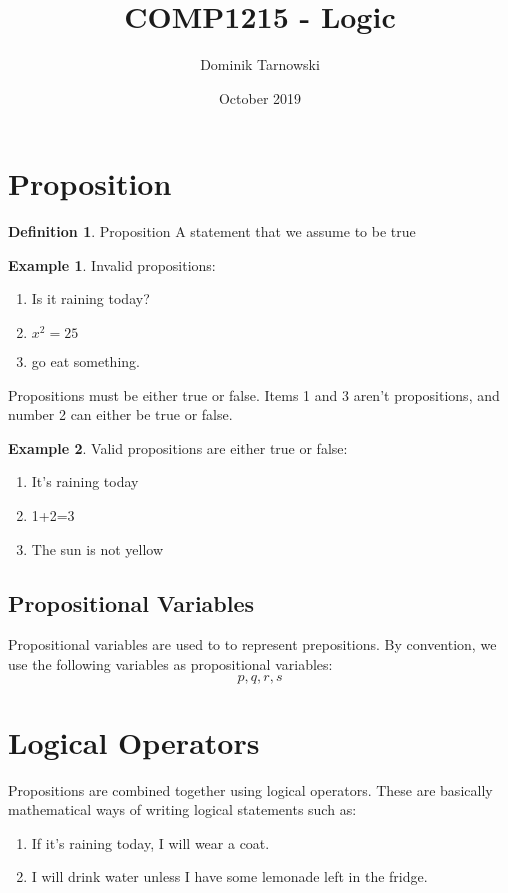 \documentclass{article}
\theoremstyle{definition}
\newtheorem{df}{Definition}[section]
\newtheorem{ex}{Example}[section]
\begin{document}
  \title{COMP1215 - Logic}
  \author{Dominik Tarnowski}
  \date{October 2019}
  \maketitle

  \tableofcontents

  \section{Proposition}
  \begin{df}{Proposition}
     A statement that we assume to be true
  \end{df}

  \begin{ex}
    Invalid propositions:
    \begin{enumerate}
      \item Is it raining today?
      \item $x^2=25$
      \item go eat something.
    \end{enumerate}
    Propositions must be either true or false. Items 1 and 3 aren't propositions, and number 2 can either be true or false.
  \end{ex}
  
  \begin{ex}
  Valid propositions are either true or false:
  \begin{enumerate}
    \item It's raining today
    \item 1+2=3
    \item The sun is not yellow
  \end{enumerate}
  \end{ex}

  \subsection{Propositional Variables}
  Propositional variables are used to to represent prepositions. By convention, we use the following variables as propositional variables:
  \[p,q,r,s\]
  

  \section{Logical Operators}
  Propositions are combined together using logical operators. These are basically mathematical ways of writing logical statements such as:
  \begin{enumerate}
    \item If it's raining today, I will wear a coat.
    \item I will drink water unless I have some lemonade left in the fridge.
  \end{enumerate}
\end{document}
